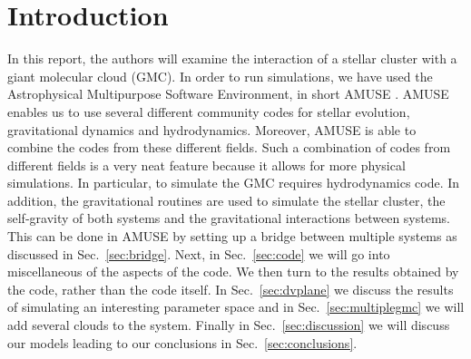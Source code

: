 \documentclass{aa}
\newcommand{\Sun}[0]{\ensuremath{_{\odot}}}
\begin{document}
\section{Introduction}
In this report, the authors will examine the interaction of a stellar cluster with a giant molecular cloud (GMC). In order to run simulations, we have used the Astrophysical Multipurpose Software Environment, in short AMUSE \citep{2009NewA...14..369P, 2013CoPhC.183..456P, 2013A&A...557A..84P}. AMUSE enables us to use several different community codes for stellar evolution, gravitational dynamics and hydrodynamics. Moreover, AMUSE is able to combine the codes from these different fields. Such a combination of codes from different fields is a very neat feature because it allows for more physical simulations. In particular, to simulate the GMC requires hydrodynamics code. In addition, the gravitational routines are used to simulate the stellar cluster, the self-gravity of both systems and the gravitational interactions between systems. This can be done in AMUSE by setting up a bridge between multiple systems as discussed in Sec.~\ref{sec:bridge}. Next, in Sec.~\ref{sec:code} we will go into miscellaneous of the aspects of the code. We then turn to the results obtained by the code, rather than the code itself. In Sec.~\ref{sec:dvplane} we discuss the results of simulating an interesting parameter space and in Sec.~\ref{sec:multiplegmc} we will add several clouds to the system. Finally in Sec.~\ref{sec:discussion} we will discuss our models leading to our conclusions in Sec.~\ref{sec:conclusions}.

\end{document}
